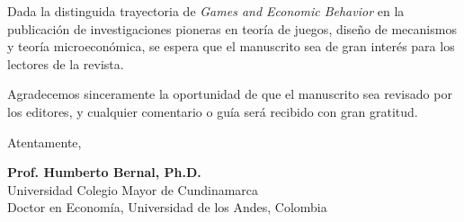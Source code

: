 \documentclass[12pt]{article}
\begin{document}
Dada la distinguida trayectoria de \textit{Games and Economic Behavior} en la publicación de investigaciones pioneras en teoría de juegos, diseño de mecanismos y teoría microeconómica, se espera que el manuscrito sea de gran interés para los lectores de la revista.

Agradecemos sinceramente la oportunidad de que el manuscrito sea revisado por los editores, y cualquier comentario o guía será recibido con gran gratitud.

\vspace{2.5em}

\begin{flushleft}
Atentamente,

\vspace{2.5em}

\textbf{Prof. Humberto Bernal, Ph.D.} \\
Universidad Colegio Mayor de Cundinamarca \\
Doctor en Economía, Universidad de los Andes, Colombia
\end{flushleft}
\end{document}
